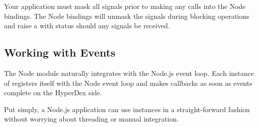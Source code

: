 Your application must mask all signals prior to making any calls into the Node
bindings.  The Node bindings will unmask the signals during blocking operations
and raise a  with status
 should any signals be received.

\subsection{Working with Events}
\label{sec:api:node:threads}

The Node module naturally integrates with the Node.js event loop.  Each instance
of  registers itself with the Node event loop and makes callbacks
as soon as events complete on the HyperDex side.

Put simply, a Node.js application can use  instances in a
straight-forward fashion without worrying about threading or manual integration.
